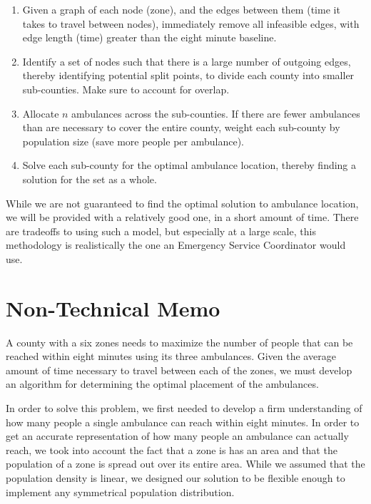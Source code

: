 \documentclass[notitlepage, 12pt]{article}
\begin{document}
\begin{enumerate}
\item Given a graph of each node (zone), and the edges between them (time it takes to travel between nodes),
    immediately remove all infeasible edges, with edge length (time) greater than the eight minute baseline.

\item Identify a set of nodes such that there is a large number of outgoing edges, thereby identifying potential
    split points, to divide each county into smaller sub-counties. Make sure to account for overlap.

\item Allocate $n$ ambulances across the sub-counties. If there are fewer ambulances than are necessary to cover
    the entire county, weight each sub-county by population size (save more people per ambulance).

\item Solve each sub-county for the optimal ambulance location, thereby finding a solution for the set as a whole.
\end{enumerate}

While we are not guaranteed to find the optimal solution to ambulance location, we will be provided with a relatively
good one, in a short amount of time. There are tradeoffs to using such a model, but especially at a large scale,
this methodology is realistically the one an Emergency Service Coordinator would use.

\newpage
\section{Non-Technical Memo}
A county with a six zones needs to maximize the number of people that can be reached within eight minutes using its three ambulances. Given the average amount of time necessary to travel  between each of the zones, we must develop an algorithm for determining the optimal placement of the ambulances.

In order to solve this problem, we first needed to develop a firm understanding of how many people a single ambulance can reach within eight minutes. In order to get an accurate representation of how many people an ambulance can actually reach, we took into account the fact that a zone is has an area and that the population of a zone is spread out over its entire area. While we assumed that the population density is linear, we designed our solution to be flexible enough to implement  any  symmetrical population distribution.
\end{document}

